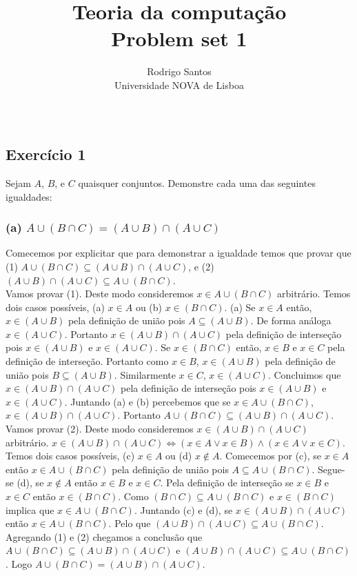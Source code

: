 \documentclass{article}
\title{Teoria da computação \large \\ Problem set 1}
\author{Rodrigo Santos\\
  \small Universidade NOVA de Lisboa\\\\
}
\date{\vspace{-5ex}}
\begin{document}
\maketitle

\subsection*{Exercício 1}
Sejam $A$, $B$, e $C$ quaisquer conjuntos. Demonstre cada uma das seguintes igualdades:

\subsubsection*{(a) $A \cup (B \cap C) = (A \cup B) \cap (A \cup C)$}
Comecemos por explicitar que para demonstrar a igualdade temos que provar que (1) $A \cup (B \cap C) \subseteq (A \cup B) \cap (A \cup C)$, e (2) $(A \cup B) \cap (A \cup C) \subseteq A \cup (B \cap C)$.
\\[\baselineskip]
Vamos provar (1). Deste modo consideremos $x \in A \cup (B \cap C)$ arbitrário. Temos dois casos possíveis, (a) $x \in A$ ou (b) $x \in (B \cap C)$. (a) Se $x \in A$ então, $x \in (A \cup B)$ pela definição de união pois $A \subseteq (A \cup B)$. De forma análoga $x \in (A \cup C)$. Portanto $x \in (A \cup B) \cap (A \cup C)$ pela definição de interseção pois $x \in (A \cup B)$ e $x \in (A \cup C)$. Se $x \in (B \cap C)$ então, $x \in B$ e $x \in C$ pela definição de interseção. Portanto como $x \in B$, $x \in (A \cup B)$ pela definição de união pois $B \subseteq (A \cup B)$. Similarmente $x \in C$, $x \in (A \cup C)$. Concluimos que $x \in (A \cup B) \cap (A \cup C)$ pela definição de interseção pois $x \in (A \cup B)$ e $x \in (A \cup C)$. Juntando (a) e (b) percebemos que se $x \in A \cup (B \cap C)$, $x \in (A \cup B) \cap (A \cup C)$. Portanto $A \cup (B \cap C) \subseteq (A \cup B) \cap (A \cup C)$.
\\[\baselineskip]
Vamos provar (2). Deste modo consideremos $x \in (A \cup B) \cap (A \cup C)$ arbitrário. $x \in (A \cup B) \cap (A \cup C) \Leftrightarrow (x \in A \vee x \in B) \wedge (x \in A \vee x \in C)$. Temos dois casos possíveis, (c) $x \in A$ ou (d) $x \notin A$. Comecemos por (c), se $x \in A$ então $x \in A \cup (B \cap C)$ pela definição de união pois $A \subseteq A \cup (B \cap C)$. Segue-se (d), se $x \notin A$ então $x \in B$ e $x \in C$. Pela definição de interseção se $x \in B$ e $x \in C$ então $x \in (B \cap C)$. Como $(B \cap C) \subseteq A \cup (B \cap C)$ e $x \in (B \cap C)$ implica que $x \in A \cup (B \cap C)$. Juntando (c) e (d), se $x \in (A \cup B) \cap (A \cup C)$ então $x \in A \cup (B \cap C)$. Pelo que $(A \cup B) \cap (A \cup C) \subseteq A \cup (B \cap C)$.
\\[\baselineskip]
Agregando (1) e (2) chegamos a conclusão que $A \cup (B \cap C) \subseteq (A \cup B) \cap (A \cup C)$ e $(A \cup B) \cap (A \cup C) \subseteq A \cup (B \cap C)$. Logo $A \cup (B \cap C) = (A \cup B) \cap (A \cup C)$.
\end{document}
